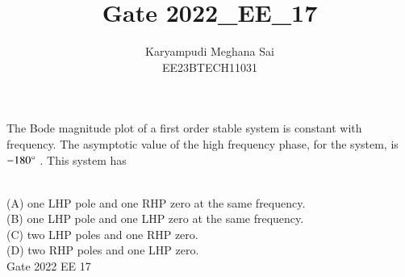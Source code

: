 \documentclass[journal,12pt,onecolumn]{IEEEtran}
\theoremstyle{remark}
\begin{document}
\let\vec\mathbf







\bigskip


\title{Gate 2022\_EE\_17}
\author{Karyampudi Meghana Sai\\ EE23BTECH11031}

\maketitle

The Bode magnitude plot of a first order stable system is constant with frequency. The asymptotic value of the high frequency phase, for the system, is $-180\degree$ . This system has \\
\begin{figure}[h]
    \centering
    \resizebox{0.55\columnwidth}{!}{}
    \caption{}
    \label{fig:gate2022ee17fig1}
\end{figure} \\
(A) one LHP pole and one RHP zero at the same frequency.\\
(B) one LHP pole and one LHP zero at the same frequency.\\
(C) two LHP poles and one RHP zero.\\
(D) two RHP poles and one LHP zero.\\
\hfill Gate 2022 EE 17
\end{document}
